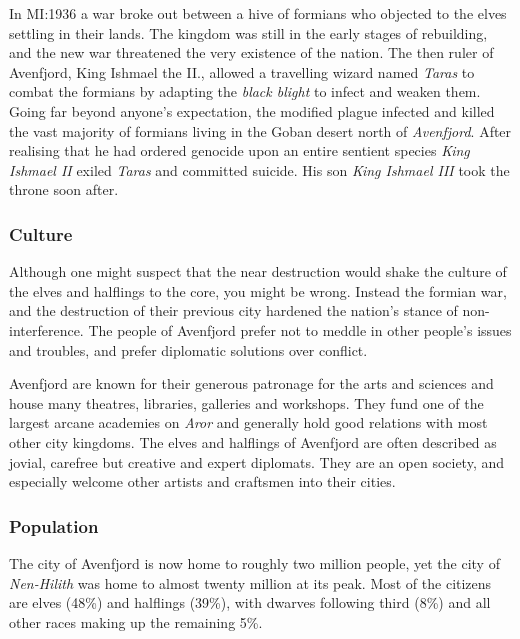In MI:1936 a war broke out between a hive of formians who objected to the
elves settling in their lands. The kingdom was still in the early stages of
rebuilding, and the new war threatened the very existence of the nation. The
then ruler of Avenfjord, King Ishmael the II., allowed a travelling wizard
named \emph{Taras} to combat the formians by adapting the \emph{black blight}
to infect and weaken them. Going far beyond anyone's expectation, the modified
plague infected and killed the vast majority of formians living in the Goban
desert north of \emph{Avenfjord}. After realising that he had ordered genocide
upon an entire sentient species \emph{King Ishmael II} exiled \emph{Taras} and
committed suicide. His son \emph{King Ishmael III} took the throne soon after.


\subsubsection*{Culture}

Although one might suspect that the near destruction would shake the culture
of the elves and halflings to the core, you might be wrong. Instead the
formian war, and the destruction of their previous city hardened the nation's
stance of non-interference. The people of Avenfjord prefer not to meddle in
other people's issues and troubles, and prefer diplomatic solutions over
conflict.

Avenfjord are known for their generous patronage for the arts and sciences and
house many theatres, libraries, galleries and workshops. They fund one of the
largest arcane academies on \emph{Aror} and generally hold good relations with
most other city kingdoms. The elves and halflings of Avenfjord are often
described as jovial, carefree but creative and expert diplomats. They are an
open society, and especially welcome other artists and craftsmen into their
cities.

\subsubsection*{Population}

The city of Avenfjord is now home to roughly two million people, yet the city
of \emph{Nen-Hilith} was home to almost twenty million at its peak. Most of
the citizens are elves (48\%) and halflings (39\%), with dwarves following
third (8\%) and all other races making up the remaining 5\%.

